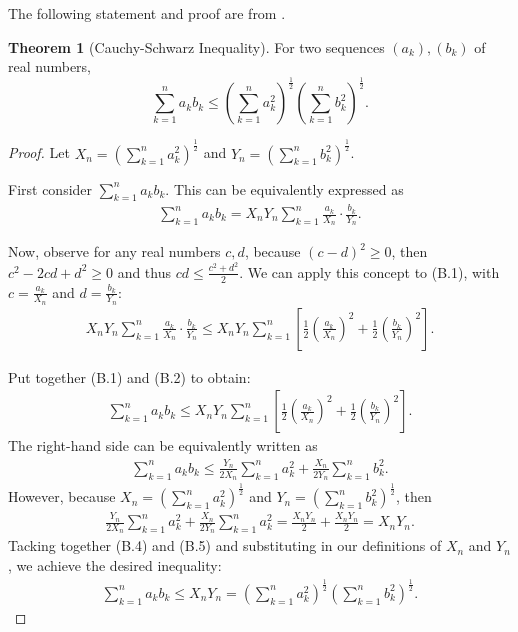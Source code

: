 \documentclass{scrippsthesisclass}
\theoremstyle{definition}
\newtheorem{theorem}{Theorem}[section]
\begin{document}
The following statement and proof are from \cite{thebook}.
\begin{theorem}[Cauchy-Schwarz Inequality]
    For two sequences $(a_k), (b_k)$ of real numbers, 
    \[
    \sum_{k=1}^n a_k b_k \leq \left(\sum_{k=1}^n a_k^2\right)^{\frac{1}{2}} \left(\sum_{k=1}^n b_k^2\right)^{\frac{1}{2}}.
    \]
\end{theorem}
\begin{proof}
    Let $X_n = \left(\sum \limits_{k=1}^n a_k^2\right)^{\frac{1}{2}}$ and $Y_n =  \left(\sum \limits_{k=1}^n b_k^2\right)^{\frac{1}{2}}$. 

    First consider $\sum_{k=1}^n a_k b_k$.
    This can be equivalently expressed as 
    \begin{align}
    \sum_{k=1}^n a_k b_k = X_n Y_n \sum_{k=1}^n \frac{a_k}{X_n} \cdot \frac{b_k}{Y_n}.
    \end{align}

    Now, observe for any real numbers $c, d$, because $(c-d)^2 \geq 0$, then $c^2 - 2cd + d^2 \geq 0$ and thus $cd \leq \frac{c^2 + d^2}{2}$. 
    We can apply this concept to (B.1), with $c = \frac{a_k}{X_n}$ and $d = \frac{b_k}{Y_n}$:
    \begin{align}
        X_n Y_n \sum_{k=1}^n \frac{a_k}{X_n} \cdot \frac{b_k}{Y_n} \leq X_n Y_n \sum_{k=1}^n \left[ \frac{1}{2} \left(\frac{a_k}{X_n}\right)^2 + \frac{1}{2} \left(\frac{b_k}{Y_n}\right)^2 \right].
    \end{align}

    Put together (B.1) and (B.2) to obtain:
    \begin{align}
        \sum_{k=1}^n a_k b_k \leq X_n Y_n \sum_{k=1}^n \left[ \frac{1}{2} \left(\frac{a_k}{X_n}\right)^2 + \frac{1}{2} \left(\frac{b_k}{Y_n}\right)^2 \right]. 
    \end{align}
    The right-hand side can be equivalently written as
    \begin{align}
        \sum_{k=1}^n a_k b_k \leq \frac{Y_n}{2X_n} \sum_{k=1}^n a_k^2 + \frac{X_n}{2Y_n} \sum_{k=1}^n b_k^2.
    \end{align}
    However, because $X_n = \left(\sum \limits_{k=1}^n a_k^2\right)^{\frac{1}{2}}$ and $Y_n =  \left(\sum \limits_{k=1}^n b_k^2\right)^{\frac{1}{2}}$, then
    \begin{align}
        \frac{Y_n}{2X_n} \sum_{k=1}^n a_k^2 + \frac{X_n}{2Y_n} \sum_{k=1}^n a_k^2 =\frac{X_n Y_n}{2} + \frac{X_n Y_n}{2} = X_n Y_n.
    \end{align}
    Tacking together (B.4) and (B.5) and substituting in our definitions of $X_n$ and $Y_n$, we achieve the desired inequality:
    \begin{align}
        \sum_{k=1}^n a_k b_k \leq X_n Y_n = \left(\sum \limits_{k=1}^n a_k^2\right)^{\frac{1}{2}}\left(\sum \limits_{k=1}^n b_k^2\right)^{\frac{1}{2}}.
    \end{align}
\end{proof}
\end{document}
